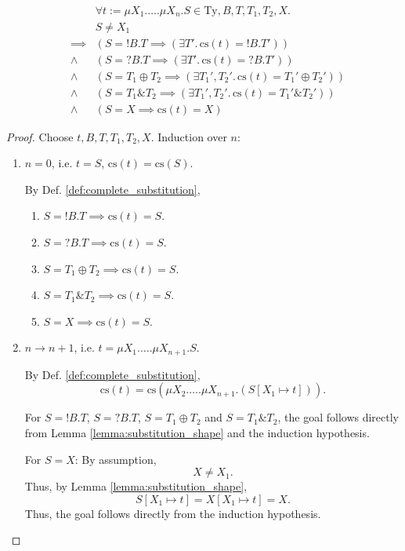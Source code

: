 \documentclass{llncs}
\newcommand*{\Ty}{\mathrm{Ty}}
\newcommand*{\cs}{\mathrm{cs}}
\newcommand*{\send}{\mathord{!}}
\newcommand*{\recv}{\mathord{?}}
\newcommand*{\echoice}{\oplus}
\newcommand*{\ichoice}{\mathop{\&}}
\renewcommand*{\|}{\;|\;}
\begin{document}
\begin{lemma}
  \label{lemma:complete_substitution_shape}
  \begin{eqnarray*}
    &&         \forall t := \mu X_1.\dots.\mu X_n.S \in \Ty, B, T, T_1, T_2, X. \\
    &&         S \neq X_1 \\
    &\implies& (S = \send B.T \implies (\exists T'.\, \cs(t) = \send B.T')) \\
    &\land&    (S = \recv B.T \implies (\exists T'.\, \cs(t) = \recv B.T')) \\
    &\land&    (S = T_1 \echoice T_2 \implies (\exists T_1', T_2'.\, \cs(t) = T_1' \echoice T_2')) \\
    &\land&    (S = T_1 \ichoice T_2 \implies (\exists T_1', T_2'.\, \cs(t) = T_1' \ichoice T_2')) \\
    &\land&    (S = X \implies \cs(t) = X)
  \end{eqnarray*}
\end{lemma}

\begin{proof}
  Choose $t, B, T, T_1, T_2, X$. Induction over $n$:
  \begin{enumerate}
    \item $n = 0$, i.e. $t = S$, $\cs(t) = \cs(S)$.

      By Def. \ref{def:complete_substitution},
      \begin{enumerate}
        \item $S = \send B.T \implies \cs(t) = S$.
        \item $S = \recv B.T \implies \cs(t) = S$.
        \item $S = T_1 \echoice T_2 \implies \cs(t) = S$.
        \item $S = T_1 \ichoice T_2 \implies \cs(t) = S$.
        \item $S = X \implies \cs(t) = S$.
      \end{enumerate}

    \item $n \to n + 1$, i.e. $t = \mu X_1.\dots.\mu X_{n+1}.S$.

      By Def. \ref{def:complete_substitution},
      \begin{equation*}
        \cs(t) = \cs(\mu X_2.\dots.\mu X_{n+1}.(S[X_1 \mapsto t])).
      \end{equation*}

      For $S = \send B.T$, $S = \recv B.T$, $S = T_1 \echoice T_2$ and
      $S = T_1 \ichoice T_2$, the goal follows directly from Lemma
      \ref{lemma:substitution_shape} and the induction hypothesis.

      For $S = X$: By assumption,
      \begin{equation*}
        X \neq X_1.
      \end{equation*}
      Thus, by Lemma \ref{lemma:substitution_shape},
      \begin{equation*}
        S[X_1 \mapsto t] = X[X_1 \mapsto t] = X.
      \end{equation*}
      Thus, the goal follows directly from the induction hypothesis.
  \end{enumerate}
\end{proof}
\end{document}
